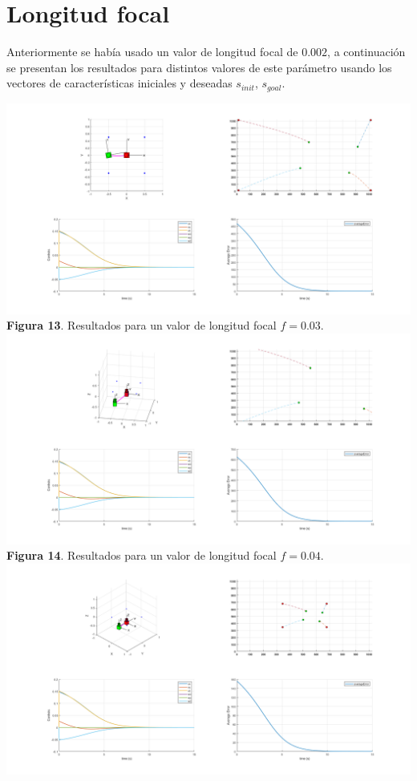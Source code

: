 \documentclass{article}
\begin{document}
	\section{Longitud focal}
	Anteriormente se hab\'ia usado un valor de longitud focal de $0.002$, a continuaci\'on se presentan los resultados para distintos valores de este par\'ametro usando los vectores de caracter\'isticas iniciales y deseadas $s_{init}$, $s_{goal}$.
	
	\begin{center}
		\includegraphics[scale=0.3]{fig5_1.png}\\
		{\footnotesize \textbf{Figura 13}. Resultados para un valor de longitud focal $f=0.03$.}\\
		\includegraphics[scale=0.3]{fig5_2.png}\\
		{\footnotesize \textbf{Figura 14}. Resultados para un valor de longitud focal $f=0.04$.}\\
		\includegraphics[scale=0.3]{fig5_3.png}\\

\end{center}
\end{document}
